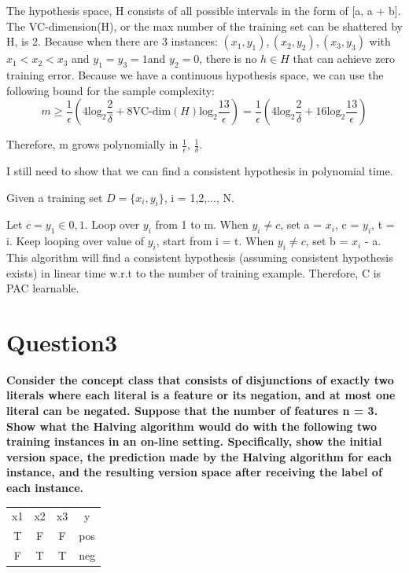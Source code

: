 \documentclass[paper=a4, fontsize=11pt]{scrartcl} %
\numberwithin{equation}{section} %
\numberwithin{figure}{section} %
\numberwithin{table}{section} %
\begin{document}
The hypothesis space, H consists of all possible intervals in the form of [a, a + b]. The VC-dimension(H), or the max number of the training set can be shattered by H, is 2. Because when there are 3 instances: $(x_1,y_1),(x_2,y_2),(x_3,y_3)$ with $x_1< x_2< x_3$ and $y_1 = y_3 = 1 $and $ y_2 = 0$, there is no $h \in H$ that can achieve zero training error. 
\bigbreak
Because we have a continuous hypothesis space, we can use the following bound for the sample complexity: 
$$
m \geq \frac{1}{\epsilon} (4 \text{log}_2 \frac{2}{\delta} + 8 \text{VC-dim}(H) \text{log}_2 \frac{13}{\epsilon}) = \frac{1}{\epsilon} (4 \text{log}_2 \frac{2}{\delta} + 16 \text{log}_2 \frac{13}{\epsilon})
$$

Therefore, m grows polynomially in $\frac{1}{\epsilon}$, $\frac{1}{\delta}$. 

\bigbreak
I still need to show that we can find a consistent hypothesis in polynomial time. 

Given a training set $D = \{x_i,y_i\}$, i = 1,2,..., N. 

Let $c = y_1 \in {0,1}$. Loop over $y_i$ from 1 to m. When $y_i \neq c$, set a = $x_i$, c = $y_i$, t = i. Keep looping over value of $y_i$, start from i = t. When $y_i \neq c$, set b = $x_i$ - a. 
\bigbreak 
This algorithm will find a consistent hypothesis (assuming consistent hypothesis exists) in linear time w.r.t to the number of training example. Therefore, C is PAC learnable. 

\newpage
\section*{Question3}
\textbf{Consider the concept class that consists of disjunctions of exactly two literals where each literal is a feature or its negation, and at most one literal can be negated. Suppose that the number of features n = 3. Show what the Halving algorithm would do with the following two training instances in an on-line setting. Specifically, show the initial version space, the prediction made by the Halving algorithm for each instance, and the resulting version space after receiving the label of each instance.}

\begin{center}
\begin{tabular}{ c c c c}
 x1 & x2 & x3 & y \\ 
 T & F & F & pos \\  
 F & T & T & neg \\  
\end{tabular}
\end{center}
\end{document}
